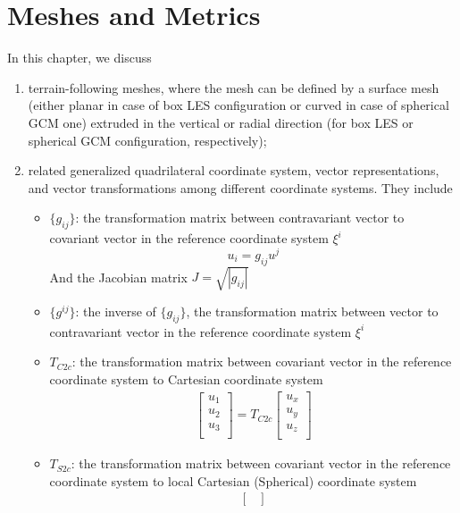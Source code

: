 \documentclass{report}
\begin{document}
\chapter{Meshes and Metrics}\label{ch:comp_mesh}


In this chapter, we discuss 
\begin{enumerate}
    \item terrain-following meshes, where the mesh can be defined by a surface mesh (either planar in case of box LES configuration or curved in case of spherical GCM one) extruded in the vertical or radial direction (for box LES or spherical GCM configuration, respectively);
    \item related generalized quadrilateral coordinate system, vector representations, and vector transformations among different coordinate systems. They include
    \begin{itemize}
    \item  $\{g_{ij}\}$: the transformation matrix between contravariant vector to covariant vector in the reference coordinate system $\xi^i$
    $$u_i = g_{ij}u^j$$
    And the Jacobian matrix $J = \sqrt{|g_{ij}|}$
    \item  $\{g^{ij}\}$: the inverse of $\{g_{ij}\}$, the transformation matrix between  vector to contravariant vector in the reference coordinate system $\xi^i$
    \item $T_{C2c}$: the transformation matrix between covariant vector in the reference coordinate system to Cartesian coordinate system
    \begin{align*}
        \begin{bmatrix}
            u_1 \\
            u_2\\
            u_3\\
        \end{bmatrix}
        = T_{C2c} 
        \begin{bmatrix}
            u_x \\
            u_y\\
            u_z\\
        \end{bmatrix}
    \end{align*}
    \item $T_{S2c}$: the transformation matrix between covariant vector in the reference coordinate system to local Cartesian (Spherical) coordinate system
        \begin{align*}
        \begin{bmatrix}

\end{bmatrix}
\end{align*}
\end{itemize}
\end{enumerate}
\end{document}
